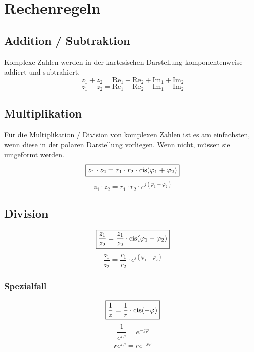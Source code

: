 \section{Rechenregeln}

\subsection{Addition / Subtraktion}
Komplexe Zahlen werden in der kartesischen Darstellung komponentenweise addiert 
und subtrahiert. 
\[ \boxed{z_1 + z_2 = \text{Re}_1 + \text{Re}_2 + \text{Im}_1 + \text{Im}_2} \]
\[ \boxed{z_1 - z_2 = \text{Re}_1 - \text{Re}_2 - \text{Im}_1 - \text{Im}_2} \]

\subsection{Multiplikation}
Für die Multiplikation / Division von komplexen Zahlen ist es am einfachsten, 
wenn diese in der polaren Darstellung vorliegen. Wenn nicht, müssen sie 
umgeformt werden. 
\[ \boxed{z_1 \cdot z_2 = r_1 \cdot r_2 \cdot \operatorname{cis}(\varphi_1 + \varphi_2)} \]
\[ \boxed{z_1 \cdot z_2 = r_1 \cdot r_2 \cdot e^{j (\varphi_1 + \varphi_2)}} \]

\subsection{Division}
\[ \boxed{\frac{z_1}{z_2} 
= \frac{z_1}{z_2} \cdot \operatorname{cis}(\varphi_1 - \varphi_2)} \]
\[ \boxed{\frac{z_1}{z_2} 
= \frac{r_1}{r_2} \cdot e^{j (\varphi_1 - \varphi_2)}} \]

\subsubsection{Spezialfall}
\[ \boxed{\frac{1}{z} = \frac{1}{r} \cdot \operatorname{cis}(-\varphi)} \]
\[ \boxed{\frac{1}{e^{j \varphi}} = e^{-j\varphi}} \]
\[ \boxed{\overline{r e^{j\varphi}} = r e^{-j\varphi}} \]


